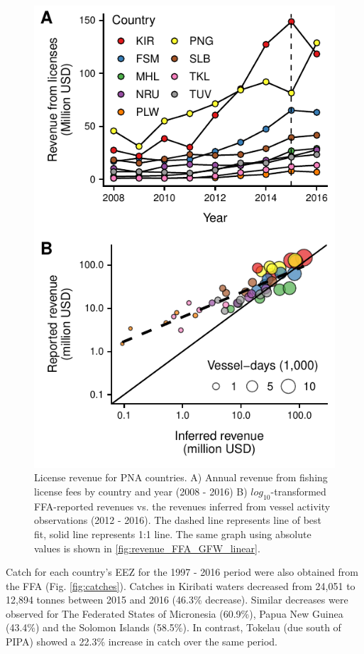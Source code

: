 \documentclass[9p,twocolumn,twoside,lineno]{pnas-new}
\begin{document}
\begin{figure}[ht]
\centering
	\includegraphics{img/revenues.pdf}
	\caption{\label{fig:revenues}
		License revenue for PNA countries. A) Annual revenue from fishing license fees by country and year (2008 - 2016) B) $log_{10}$-transformed FFA-reported revenues vs. the revenues inferred from vessel activity observations (2012 - 2016). The dashed line represents line of best fit, solid line represents 1:1 line. The same graph using absolute values is shown in \ref{fig:revenue_FFA_GFW_linear}.}
\end{figure}

Catch for each country's EEZ for the 1997 - 2016 period were also obtained from the FFA (Fig. \ref{fig:catches}). Catches in Kiribati waters decreased from 24,051 to 12,894 tonnes between 2015 and 2016 (46.3\% decrease). Similar decreases were observed for The Federated States of Micronesia (60.9\%), Papua New Guinea (43.4\%) and the Solomon Islands (58.5\%). In contrast, Tokelau (due south of PIPA) showed a 22.3\% increase in catch over the same period.
\end{document}
